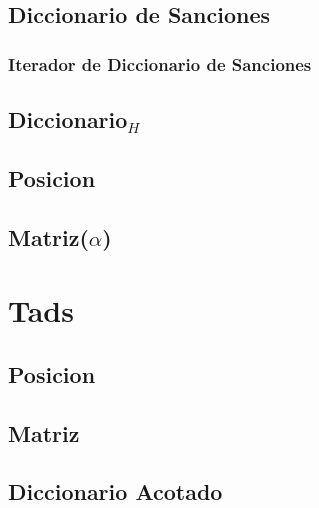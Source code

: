 \documentclass[a4paper,10pt, nofootinbib]{article}
\begin{document}
\subsection{Diccionario de Sanciones}

\subsubsection{Iterador de Diccionario de Sanciones}


\subsection{Diccionario$_H$}


\subsection{Posicion}


\subsection{Matriz($\alpha$)}



\section{Tads}
\subsection{Posicion}


\subsection{Matriz}


\subsection{Diccionario Acotado}

\end{document}
